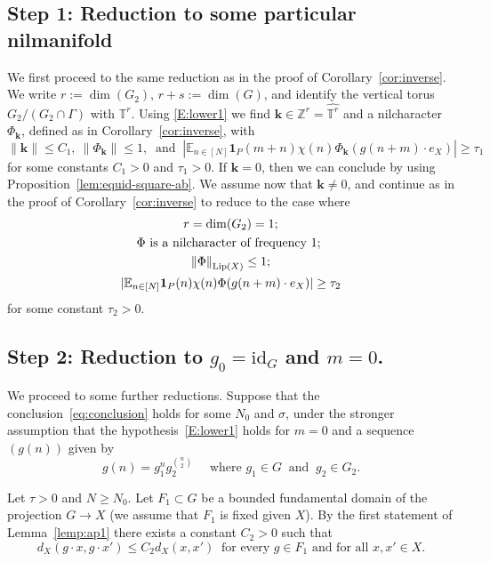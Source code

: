 \documentclass[11pt]{amsart}
\theoremstyle{definition}
\begin{document}
\subsection{Step 1: Reduction to some particular nilmanifold}
We first proceed to the same reduction as in the proof of Corollary~\ref{cor:inverse}. We write $r:=\dim(G_2)$, $r+s:=\dim(G)$,  and identify the vertical torus $G_2/(G_2\cap\Gamma)$ with ${{\mathbb T}}^r$. Using \eqref{E:lower1}  we find ${{\mathbf{k}}}\in{{\mathbb Z}}^r=\widehat{{{\mathbb T}}^r}$ and a nilcharacter $\Phi_{{\mathbf{k}}}$, defined as in Corollary~\eqref{cor:inverse}, with
$$
{\lVert {{\mathbf{k}}} \rVert}\leq C_1,\
{\lVert {\Phi_{{\mathbf{k}}}} \rVert}\leq 1,\ \text{ and }\
|{{\mathbb E}}_{n\in[N]} {\mathbf{1}}_P(m+n)
\chi(n)\Phi_{{\mathbf{k}}}(g(n+m)\cdot e_X)|\geq\tau_1
$$
for some constants $C_1>0$ and $\tau_1>0$.  If ${{\mathbf{k}}}=0$, then we can conclude by using Proposition~\ref{lem:equid-square-ab}. We assume now that ${{\mathbf{k}}}\neq 0$, and  continue as in the proof of  Corollary~\ref{cor:inverse} to reduce to the case where
\begin{gather}
\notag
r=\dim(G_2)=1;\\
\notag
\Phi\text{ is a nilcharacter of frequency $1$; }\\
\notag
{\lVert \Phi \rVert}_{{{\text{\rm Lip}}}(X)}\leq 1;\\
\label{E:lower2}
|{{\mathbb E}}_{n\in[N]} {\mathbf{1}}_P(n) \chi(n)\Phi(g(n+m)\cdot e_X)|\geq\tau_2
\end{gather}
for some constant $\tau_2>0$.

\subsection{Step 2: Reduction to $g_0=\text{id}_G$  and $m=0$.}
We proceed to  some further reductions.
 Suppose that the conclusion~\eqref{eq:conclusion}
 holds  for some $N_0$ and $\sigma$,
  under the stronger assumption that the hypothesis~\eqref{E:lower1}
 holds for $m=0$ and a sequence $(g(n))$ given by
$$
g(n)=g_1^ng_2^{\binom n2}\quad \text{ where }g_1\in G\ \text{ and }\ g_2\in G_2.
$$

 Let $\tau>0$ and $N\geq N_0$. Let $F_1\subset G$ be a bounded fundamental domain of the projection $G\to X$ (we assume that $F_1$ is fixed given $X$).  By the first statement of Lemma~\ref{lemp:ap1} there exists a constant $C_2>0$ such that
\begin{equation}
\label{E:C2}
d_X(g\cdot x,g\cdot x')\leq C_2 d_X(x,x')\  \text{ for every }g\in F_1 \text{ and for all }x,x'\in X.
\end{equation}
\end{document}
